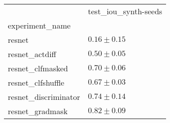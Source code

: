 \begin{tabular}{ll}
\toprule
{} & test_iou_synth-seeds \\
experiment_name      &                      \\
\midrule
resnet               &        $0.16\pm0.15$ \\
resnet_actdiff       &        $0.50\pm0.05$ \\
resnet_clfmasked     &        $0.70\pm0.06$ \\
resnet_clfshuffle    &        $0.67\pm0.03$ \\
resnet_discriminator &        $0.74\pm0.14$ \\
resnet_gradmask      &        $0.82\pm0.09$ \\
\bottomrule
\end{tabular}

